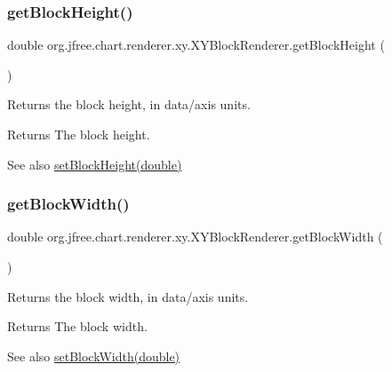 \subsubsection{\texorpdfstring{get\+Block\+Height()}{getBlockHeight()}}
{\footnotesize\ttfamily double org.\+jfree.\+chart.\+renderer.\+xy.\+X\+Y\+Block\+Renderer.\+get\+Block\+Height (\begin{DoxyParamCaption}{ }\end{DoxyParamCaption})}

Returns the block height, in data/axis units.

\begin{DoxyReturn}{Returns}
The block height.
\end{DoxyReturn}
\begin{DoxySeeAlso}{See also}
\mbox{\hyperlink{classorg_1_1jfree_1_1chart_1_1renderer_1_1xy_1_1_x_y_block_renderer_aae2bb132aaced9d2a933b9dd9b981a0c}{set\+Block\+Height(double)}} 
\end{DoxySeeAlso}
\mbox{\label{classorg_1_1jfree_1_1chart_1_1renderer_1_1xy_1_1_x_y_block_renderer_acdc4373b03cf11a77d5ded9da046838a}} 
\subsubsection{\texorpdfstring{get\+Block\+Width()}{getBlockWidth()}}
{\footnotesize\ttfamily double org.\+jfree.\+chart.\+renderer.\+xy.\+X\+Y\+Block\+Renderer.\+get\+Block\+Width (\begin{DoxyParamCaption}{ }\end{DoxyParamCaption})}

Returns the block width, in data/axis units.

\begin{DoxyReturn}{Returns}
The block width.
\end{DoxyReturn}
\begin{DoxySeeAlso}{See also}
\mbox{\hyperlink{classorg_1_1jfree_1_1chart_1_1renderer_1_1xy_1_1_x_y_block_renderer_a83c689e43e5824dacae3ad92c8f376b1}{set\+Block\+Width(double)}} 
\end{DoxySeeAlso}
\mbox{\label{classorg_1_1jfree_1_1chart_1_1renderer_1_1xy_1_1_x_y_block_renderer_ab9b579727809c4213cce490cbeed1d94}} 
